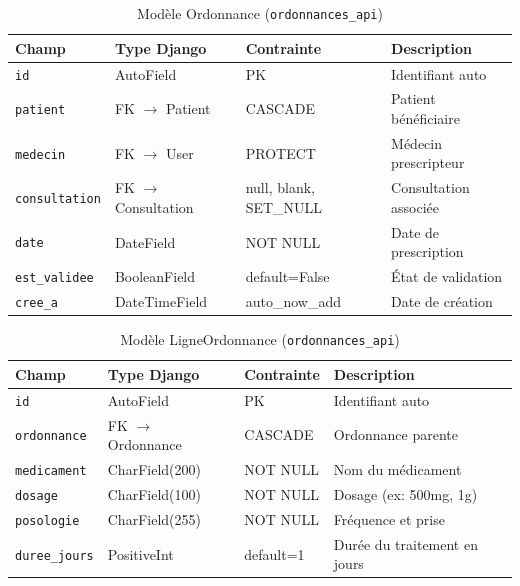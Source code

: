 \documentclass[12pt,a4paper]{report}
\begin{document}
\begin{table}[H]
\centering
\caption{Modèle Ordonnance (\texttt{ordonnances\_api})}
\renewcommand{\arraystretch}{1.4}
\begin{tabular}{|p{3.5cm}|p{3.5cm}|p{3cm}|p{4cm}|}
  \hline
  \rowcolor{medaccent}
  \textbf{Champ} & \textbf{Type Django} & \textbf{Contrainte} & \textbf{Description} \\
  \hline
  \texttt{id} & AutoField & PK & Identifiant auto \\
  \hline
  \texttt{patient} & FK $\rightarrow$ Patient & CASCADE & Patient bénéficiaire \\
  \hline
  \texttt{medecin} & FK $\rightarrow$ User & PROTECT & Médecin prescripteur \\
  \hline
  \texttt{consultation} & FK $\rightarrow$ Consultation & null, blank, SET\_NULL & Consultation associée \\
  \hline
  \texttt{date} & DateField & NOT NULL & Date de prescription \\
  \hline
  \texttt{est\_validee} & BooleanField & default=False & État de validation \\
  \hline
  \texttt{cree\_a} & DateTimeField & auto\_now\_add & Date de création \\
  \hline
\end{tabular}
\end{table}

\begin{table}[H]
\centering
\caption{Modèle LigneOrdonnance (\texttt{ordonnances\_api})}
\renewcommand{\arraystretch}{1.4}
\begin{tabular}{|p{3.5cm}|p{3.5cm}|p{3cm}|p{4cm}|}
  \hline
  \rowcolor{medaccent}
  \textbf{Champ} & \textbf{Type Django} & \textbf{Contrainte} & \textbf{Description} \\
  \hline
  \texttt{id} & AutoField & PK & Identifiant auto \\
  \hline
  \texttt{ordonnance} & FK $\rightarrow$ Ordonnance & CASCADE & Ordonnance parente \\
  \hline
  \texttt{medicament} & CharField(200) & NOT NULL & Nom du médicament \\
  \hline
  \texttt{dosage} & CharField(100) & NOT NULL & Dosage (ex: 500mg, 1g) \\
  \hline
  \texttt{posologie} & CharField(255) & NOT NULL & Fréquence et prise \\
  \hline
  \texttt{duree\_jours} & PositiveInt & default=1 & Durée du traitement en jours \\
  \hline
\end{tabular}
\end{table}
\end{document}
